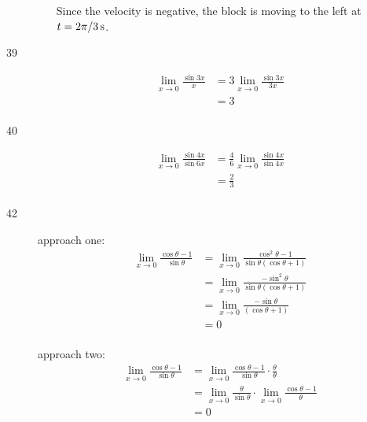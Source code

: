 \documentclass[letterpaper, landscape]{exam}
\begin{document}
\begin{description}
\begin{enumerate}[(a)]
          Since the velocity is negative, the block is moving to the left at 
          $t = \unit[2 \pi/3]{s}$.

      \end{enumerate}

    \item[39] 
      \begin{align*}
        \lim_{x \to 0} \frac{\sin 3x}{x} & = 3 \lim_{x \to 0} \frac{\sin 3x}{3x} \\
                                         & = \boxed{ 3 } \\
      \end{align*}

    \item[40] 
      \begin{align*}
        \lim_{x \to 0} \frac{\sin 4x}{\sin 6x} & = \frac{4}{6} \lim_{x \to 0} \frac{\sin 4x}{\sin 4x} \\
                                               & = \boxed{ \frac{2}{3} } \\
      \end{align*}

    \item[42] 
      approach one:
      \begin{align*}
        \lim_{x \to 0} \frac{\cos \theta - 1}{\sin \theta} 
          & = \lim_{x \to 0} \frac{\cos^2 \theta - 1}{\sin \theta (\cos \theta + 1)} \\
          & = \lim_{x \to 0} \frac{- \sin^2 \theta}{\sin \theta (\cos \theta + 1)} \\
          & = \lim_{x \to 0} \frac{- \sin \theta}{(\cos \theta + 1)} \\
          & = \boxed{ 0 } \\
      \end{align*}

      approach two:
      \begin{align*}
        \lim_{x \to 0} \frac{\cos \theta - 1}{\sin \theta} 
          & = \lim_{x \to 0} \frac{\cos \theta - 1}{\sin \theta} \cdot \frac{\theta}{\theta} \\
          & = \lim_{x \to 0} \frac{\theta}{\sin \theta} \cdot \lim_{x \to 0} \frac{\cos \theta - 1}{\theta} \\
          & = \boxed{ 0 } \\
      \end{align*}
    \newpage


\end{description}
\end{document}
